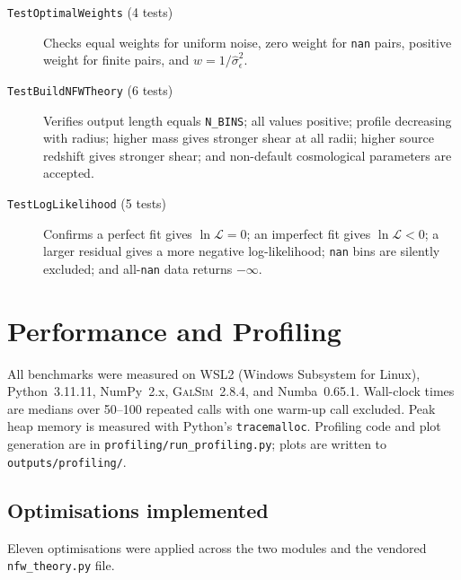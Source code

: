 \begin{description}
  \item[\texttt{TestOptimalWeights} (4 tests)]
    Checks equal weights for uniform noise, zero weight for \texttt{nan} pairs,
    positive weight for finite pairs, and $w = 1/\hat\sigma_\epsilon^2$.

  \item[\texttt{TestBuildNFWTheory} (6 tests)]
    Verifies output length equals \texttt{N\_BINS}; all values positive; profile
    decreasing with radius; higher mass gives stronger shear at all radii; higher
    source redshift gives stronger shear; and non-default cosmological parameters
    are accepted.

  \item[\texttt{TestLogLikelihood} (5 tests)]
    Confirms a perfect fit gives $\ln\mathcal{L} = 0$; an imperfect fit gives
    $\ln\mathcal{L} < 0$; a larger residual gives a more negative
    log-likelihood; \texttt{nan} bins are silently excluded; and all-\texttt{nan}
    data returns $-\infty$.
\end{description}

\section{Performance and Profiling}
\label{app:performance}

All benchmarks were measured on WSL2 (Windows Subsystem for Linux),
Python~3.11.11, NumPy~2.x, \textsc{GalSim}~2.8.4, and Numba~0.65.1.
Wall-clock times are medians over 50--100 repeated calls with one warm-up call
excluded. Peak heap memory is measured with Python's \texttt{tracemalloc}.
Profiling code and plot generation are in \texttt{profiling/run\_profiling.py};
plots are written to \texttt{outputs/profiling/}.

\subsection{Optimisations implemented}

Eleven optimisations were applied across the two modules and the vendored
\texttt{nfw\_theory.py} file.

